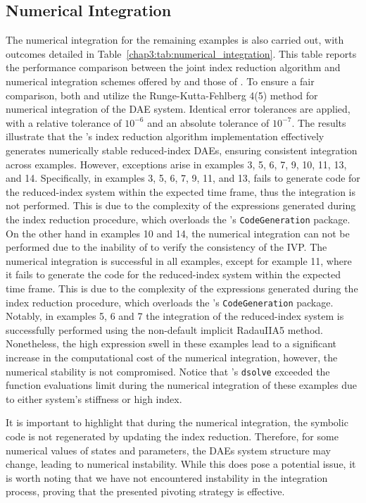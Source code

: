 \subsection{Numerical Integration}

The numerical integration for the remaining examples is also carried out, with outcomes detailed in Table~\ref{chap3:tab:numerical_integration}. This table reports the performance comparison between the joint index reduction algorithm and numerical integration schemes offered by \Maple{} and those of \Indigo{}. To ensure a fair comparison, both \Maple{} and \Indigo{} utilize the Runge-Kutta-Fehlberg 4(5) method for numerical integration of the \ac{DAE} system. Identical error tolerances are applied, with a relative tolerance of $10^{-6}$ and an absolute tolerance of $10^{-7}$. The results illustrate that the \Indigo{}'s index reduction algorithm implementation effectively generates numerically stable reduced-index \acp{DAE}, ensuring consistent integration across examples. However, exceptions arise in examples 3, 5, 6, 7, 9, 10, 11, 13, and 14. Specifically, in examples 3, 5, 6, 7, 9, 11, and 13, \Maple{} fails to generate code for the reduced-index system within the expected time frame, thus the integration is not performed. This is due to the complexity of the expressions generated during the index reduction procedure, which overloads the \Maple{}'s \texttt{CodeGeneration} package. On the other hand in examples 10 and 14, the numerical integration can not be performed due to the inability of \Maple{} to verify the consistency of the \ac{IVP}. The \Indigo{} numerical integration is successful in all examples, except for example 11, where it fails to generate the code for the reduced-index system within the expected time frame. This is due to the complexity of the expressions generated during the index reduction procedure, which overloads the \Indigo{}'s \texttt{CodeGeneration} package. Notably, in examples 5, 6 and 7 the integration of the reduced-index system is successfully performed using the non-default implicit RadauIIA5 method. Nonetheless, the high expression swell in these examples lead to a significant increase in the computational cost of the numerical integration, however, the numerical stability is not compromised. Notice that \Maple{}'s \texttt{dsolve} exceeded the function evaluations limit during the numerical integration of these examples due to either system's stiffness or high index.

It is important to highlight that during the numerical integration, the symbolic code is not regenerated by updating the index reduction. Therefore, for some numerical values of states and parameters, the \acp{DAE} system structure may change, leading to numerical instability. While this does pose a potential issue, it is worth noting that we have not encountered instability in the integration process, proving that the presented pivoting strategy is effective.



